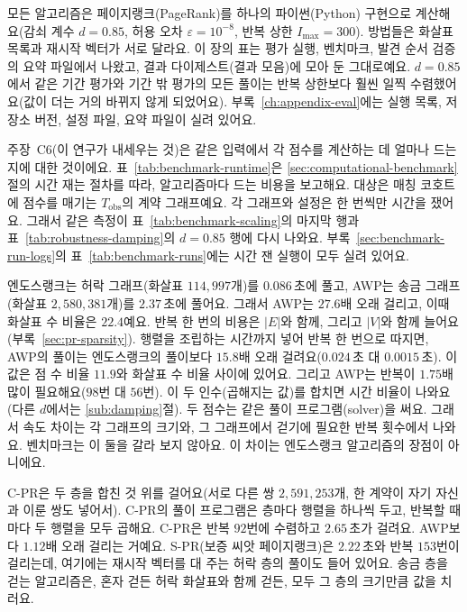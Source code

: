 
모든 알고리즘은 페이지랭크(PageRank)를 하나의 파이썬(Python) 구현으로 계산해요(감쇠 계수 $d=0.85$, 허용 오차 $\varepsilon=10^{-8}$, 반복 상한 $I_{\max}=300$). 방법들은 화살표 목록과 재시작 벡터가 서로 달라요. 이 장의 표는 평가 실행, 벤치마크, 발견 순서 검증의 요약 파일에서 나왔고, 결과 다이제스트(결과 모음)에 모아 둔 그대로예요. $d=0.85$에서 같은 기간 평가와 기간 밖 평가의 모든 풀이는 반복 상한보다 훨씬 일찍 수렴했어요(값이 더는 거의 바뀌지 않게 되었어요). 부록~\ref{ch:appendix-eval}에는 실행 목록, 저장소 버전, 설정 파일, 요약 파일이 실려 있어요.


주장~C6(이 연구가 내세우는 것)은 같은 입력에서 각 점수를 계산하는 데 얼마나 드는지에 대한 것이에요. 표~\ref{tab:benchmark-runtime}은 \ref{sec:computational-benchmark}절의 시간 재는 절차를 따라, 알고리즘마다 드는 비용을 보고해요. 대상은 매칭 코호트에 점수를 매기는 $T_{\mathrm{obs}}$의 계약 그래프예요. 각 그래프와 설정은 한 번씩만 시간을 쟀어요. 그래서 같은 측정이 표~\ref{tab:benchmark-scaling}의 마지막 행과 표~\ref{tab:robustness-damping}의 $d=0.85$ 행에 다시 나와요. 부록~\ref{sec:benchmark-run-logs}의 표~\ref{tab:benchmark-runs}에는 시간 잰 실행이 모두 실려 있어요.



엔도스랭크는 허락 그래프(화살표 $114{,}997$개)를 $0.086$\,초에 풀고, AWP는 송금 그래프(화살표 $2{,}580{,}381$개)를 $2.37$\,초에 풀어요. 그래서 AWP는 $27.6$배 오래 걸리고, 이때 화살표 수 비율은 $22.4$예요. 반복 한 번의 비용은 $|E|$와 함께, 그리고 $|V|$와 함께 늘어요(부록~\ref{sec:pr-sparsity}). 행렬을 조립하는 시간까지 넣어 반복 한 번으로 따지면, AWP의 풀이는 엔도스랭크의 풀이보다 $15.8$배 오래 걸려요($0.024$\,초 대 $0.0015$\,초). 이 값은 점 수 비율 $11.9$와 화살표 수 비율 사이에 있어요. 그리고 AWP는 반복이 $1.75$배 많이 필요해요($98$번 대 $56$번). 이 두 인수(곱해지는 값)를 합치면 시간 비율이 나와요(다른 $d$에서는 \ref{sub:damping}절). 두 점수는 같은 풀이 프로그램(solver)을 써요. 그래서 속도 차이는 각 그래프의 크기와, 그 그래프에서 걷기에 필요한 반복 횟수에서 나와요. 벤치마크는 이 둘을 갈라 보지 않아요. 이 차이는 엔도스랭크 알고리즘의 장점이 아니에요.

\mbox{C-PR}은 두 층을 합친 것 위를 걸어요(서로 다른 쌍 $2{,}591{,}253$개, 한 계약이 자기 자신과 이룬 쌍도 넣어서). \mbox{C-PR}의 풀이 프로그램은 층마다 행렬을 하나씩 두고, 반복할 때마다 두 행렬을 모두 곱해요. \mbox{C-PR}은 반복 $92$번에 수렴하고 $2.65$\,초가 걸려요. AWP보다 $1.12$배 오래 걸리는 거예요. \mbox{S-PR}(보증 씨앗 페이지랭크)은 $2.22$\,초와 반복 $153$번이 걸리는데, 여기에는 재시작 벡터를 대 주는 허락 층의 풀이도 들어 있어요. 송금 층을 걷는 알고리즘은, 혼자 걷든 허락 화살표와 함께 걷든, 모두 그 층의 크기만큼 값을 치러요.

